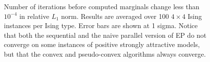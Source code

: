 \documentclass[times, 10pt,twocolumn]{article}
\begin{document}
\begin{figure}
	\caption{Number of iterations before computed marginals change less than $10^{-4}$ in relative $L_1$ norm. Results are averaged over 100 $4 \times 4$ Ising instances per Ising type. Error bars are shown at 1 sigma. Notice that both the sequential and the naive parallel version of EP do not converge on some instances of positive strongly attractive models, but that the convex and pseudo-convex algorithms always converge.}
\end{figure}

\newpage
\end{document}

